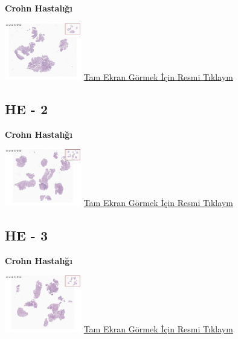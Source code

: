 \documentclass[
  letterpaper,
  DIV=11,
  numbers=noendperiod]{scrreprt}
\begin{document}
\textbf{Crohn Hastalığı}

\href{https://images.patolojiatlasi.com/crohn-colonoscopic-biopsy/HE1.html}{\includegraphics[width=0.25\textwidth,height=\textheight]{./screenshots/crohn-colonoscopic-biopsy-HE1_screenshot.png}}
\href{https://images.patolojiatlasi.com/crohn-colonoscopic-biopsy/HE1.html}{Tam
Ekran Görmek İçin Resmi Tıklayın}

\hypertarget{he---2}{%
\subsection{HE - 2}\label{he---2}}

\textbf{Crohn Hastalığı}

\href{https://images.patolojiatlasi.com/crohn-colonoscopic-biopsy/HE2.html}{\includegraphics[width=0.25\textwidth,height=\textheight]{./screenshots/crohn-colonoscopic-biopsy-HE2_screenshot.png}}
\href{https://images.patolojiatlasi.com/crohn-colonoscopic-biopsy/HE2.html}{Tam
Ekran Görmek İçin Resmi Tıklayın}

\hypertarget{he---3}{%
\subsection{HE - 3}\label{he---3}}

\textbf{Crohn Hastalığı}

\href{https://images.patolojiatlasi.com/crohn-colonoscopic-biopsy/HE3.html}{\includegraphics[width=0.25\textwidth,height=\textheight]{./screenshots/crohn-colonoscopic-biopsy-HE3_screenshot.png}}
\href{https://images.patolojiatlasi.com/crohn-colonoscopic-biopsy/HE3.html}{Tam
Ekran Görmek İçin Resmi Tıklayın}
\end{document}
